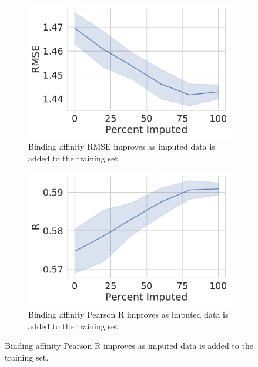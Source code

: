 \documentclass[journal=jmcmar,manuscript=article]{achemso}
\begin{document}
\begin{figure}[tbph]
    \centering
    \begin{subfigure}[t]{0.48\textwidth}
        \centering
        \includegraphics[width=\linewidth]{figures/MedGOEns_addingImpRMSE.pdf}
        \caption{Binding affinity RMSE improves as imputed data is added to the training set.}
    \end{subfigure}
    \hfill
    \begin{subfigure}[t]{0.48\textwidth}
        \centering
        \includegraphics[width=\linewidth]{figures/MedGOEns_addingImpR.pdf}
        \caption{Binding affinity Pearson R improves as imputed data is added to the training set.}
    \end{subfigure}


\end{figure}
\end{document}
